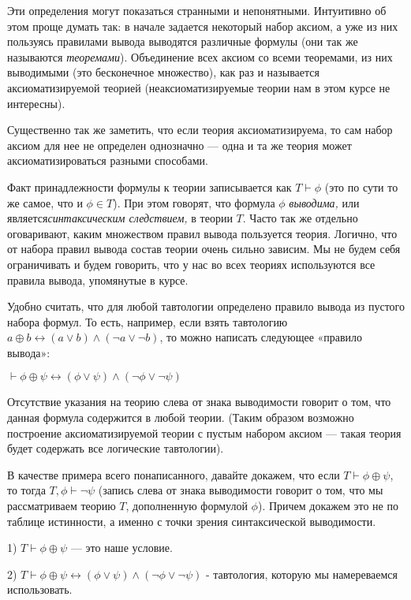 Эти определения могут показаться странными и непонятными. Интуитивно об этом проще думать так: в начале задается некоторый набор аксиом, а уже из них пользуясь правилами вывода выводятся различные формулы (они так же называются {\slshape теоремами}). Объединение всех аксиом со всеми теоремами, из них выводимыми (это бесконечное множество), как раз и называется аксиоматизируемой теорией (неаксиоматизируемые теории нам в этом курсе не интересны).

Существенно так же заметить, что если теория аксиоматизируема, то сам набор аксиом для нее не определен однозначно — одна и та же теория может аксиоматизироваться разными способами.

Факт принадлежности формулы к теории записывается как $T\vdash\phi$ (это по сути то же самое, что и $\phi \in T$). При этом говорят, что формула $\phi$ {\slshape выводима, }или является{\slshape  синтаксическим следствием,} в теории $T$. Часто так же отдельно оговаривают, каким множеством правил вывода пользуется теория. Логично, что от набора правил вывода состав теории очень сильно зависим. Мы не будем себя ограничивать и будем говорить, что у нас во всех теориях используются все правила вывода, упомянутые в курсе.

Удобно считать, что для любой тавтологии определено правило вывода из пустого набора формул. То есть, например, если взять тавтологию $a\oplus b \leftrightarrow (a\vee b) \wedge (\neg a \vee \neg b)$, то можно написать следующее «правило вывода»:

$\vdash \phi\oplus \psi \leftrightarrow (\phi\vee \psi) \wedge (\neg \phi \vee \neg \psi)$

Отсутствие указания на теорию слева от знака выводимости говорит о том, что данная формула содержится в любой теории. (Таким образом возможно построение аксиоматизируемой теории с пустым набором аксиом — такая теория будет содержать все логические тавтологии).

В качестве примера всего понаписанного, давайте докажем, что если $T\vdash \phi\oplus\psi$, то тогда $T,\phi\vdash\neg\psi$ (запись слева от знака выводимости говорит о том, что мы рассматриваем теорию $T$, дополненную формулой $\phi$). Причем докажем это не по таблице истинности, а именно с точки зрения синтаксической выводимости.

1) $T \vdash \phi \oplus \psi$ — это наше условие.

2) $T \vdash \phi\oplus \psi \leftrightarrow (\phi\vee \psi) \wedge (\neg \phi \vee \neg \psi)$ - тавтология, которую мы намереваемся использовать.

